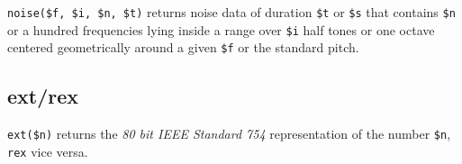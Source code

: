 \documentclass[a4paper, 10pt]{article}
\begin{document}
	\verb|noise($f, $i, $n, $t)| returns noise data of duration \verb|$t| or \verb|$s| that contains \verb|$n| or a hundred frequencies lying inside a range over \verb|$i| half tones or one octave centered geometrically around a given \verb|$f| or the standard pitch.
	
	\subsection*{ext/rex}
	
	\verb|ext($n)| returns the {\it 80 bit IEEE Standard 754} representation of the number \verb|$n|, \verb|rex| vice versa.
\end{document}
